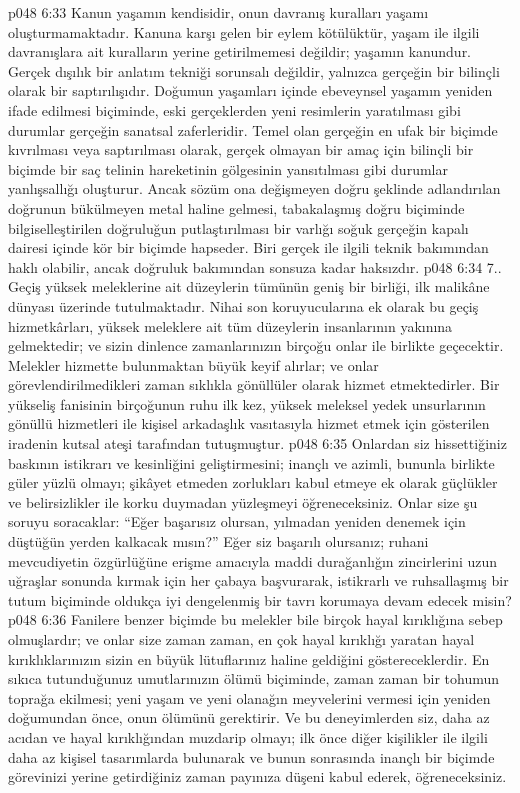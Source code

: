 \vs p048 6:33 Kanun yaşamın kendisidir, onun davranış kuralları yaşamı oluşturmamaktadır. Kanuna karşı gelen bir eylem kötülüktür, yaşam ile ilgili davranışlara ait kuralların yerine getirilmemesi değildir; yaşamın  kanundur. Gerçek dışılık bir anlatım tekniği sorunsalı değildir, yalnızca gerçeğin bir bilinçli olarak bir saptırılışıdır. Doğumun yaşamları içinde ebeveynsel yaşamın yeniden ifade edilmesi biçiminde, eski gerçeklerden yeni resimlerin yaratılması gibi durumlar gerçeğin sanatsal zaferleridir. Temel olan gerçeğin en ufak bir biçimde kıvrılması veya saptırılması olarak, gerçek olmayan bir amaç için bilinçli bir biçimde bir saç telinin hareketinin gölgesinin yansıtılması gibi durumlar yanlışsallığı oluşturur. Ancak sözüm ona değişmeyen doğru şeklinde adlandırılan doğrunun bükülmeyen metal haline gelmesi, tabakalaşmış doğru biçiminde bilgiselleştirilen doğruluğun putlaştırılması bir varlığı soğuk gerçeğin kapalı dairesi içinde kör bir biçimde hapseder. Biri gerçek ile ilgili teknik bakımından haklı olabilir, ancak doğruluk bakımından sonsuza kadar haksızdır.
\vs p048 6:34 7.\bibnobreakspace {}. Geçiş yüksek meleklerine ait düzeylerin tümünün geniş bir birliği, ilk malikâne dünyası üzerinde tutulmaktadır. Nihai son koruyucularına ek olarak bu geçiş hizmetkârları, yüksek meleklere ait tüm düzeylerin insanlarının yakınına gelmektedir; ve sizin dinlence zamanlarınızın birçoğu onlar ile birlikte geçecektir. Melekler hizmette bulunmaktan büyük keyif alırlar; ve onlar görevlendirilmedikleri zaman sıklıkla gönüllüler olarak hizmet etmektedirler. Bir yükseliş fanisinin birçoğunun ruhu ilk kez, yüksek meleksel yedek unsurlarının gönüllü hizmetleri ile kişisel arkadaşlık vasıtasıyla hizmet etmek için gösterilen iradenin kutsal ateşi tarafından tutuşmuştur.
\vs p048 6:35 Onlardan siz hissettiğiniz baskının istikrarı ve kesinliğini geliştirmesini; inançlı ve azimli, bununla birlikte güler yüzlü olmayı; şikâyet etmeden zorlukları kabul etmeye ek olarak güçlükler ve belirsizlikler ile korku duymadan yüzleşmeyi öğreneceksiniz. Onlar size şu soruyu soracaklar: “Eğer başarısız olursan, yılmadan yeniden denemek için düştüğün yerden kalkacak mısın?” Eğer siz başarılı olursanız; ruhani mevcudiyetin özgürlüğüne erişme amacıyla maddi durağanlığın zincirlerini uzun uğraşlar sonunda kırmak için her çabaya başvurarak, istikrarlı ve ruhsallaşmış bir tutum biçiminde oldukça iyi dengelenmiş bir tavrı korumaya devam edecek misin?
\vs p048 6:36 Fanilere benzer biçimde bu melekler bile birçok hayal kırıklığına sebep olmuşlardır; ve onlar size zaman zaman, en çok hayal kırıklığı yaratan hayal kırıklıklarınızın sizin en büyük lütuflarınız haline geldiğini göstereceklerdir. En sıkıca tutunduğunuz umutlarınızın ölümü biçiminde, zaman zaman bir tohumun toprağa ekilmesi; yeni yaşam ve yeni olanağın meyvelerini vermesi için yeniden doğumundan önce, onun ölümünü gerektirir. Ve bu deneyimlerden siz, daha az acıdan ve hayal kırıklığından muzdarip olmayı; ilk önce diğer kişilikler ile ilgili daha az kişisel tasarımlarda bulunarak ve bunun sonrasında inançlı bir biçimde görevinizi yerine getirdiğiniz zaman payınıza düşeni kabul ederek, öğreneceksiniz.
